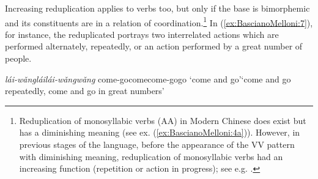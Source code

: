\documentclass[output=paper]{langsci/langscibook}
\begin{document}
Increasing reduplication applies to verbs too, but only if the base is
bimorphemic and its constituents are in a relation of
coordination.\footnote{Reduplication of monosyllabic verbs (AA) in Modern
  Chinese  does exist but has a diminishing meaning (see ex. (\ref{ex:BascianoMelloni:4a})).
  However, in previous stages of the language, before the appearance of
  the VV pattern with diminishing meaning, reduplication of monosyllabic
  verbs had an increasing function (repetition or action in progress);
  see e.g. \citet[7]{Xu2012a}.} 
  In (\ref{ex:BascianoMelloni:7}), for instance, the reduplicated 
portrays two interrelated actions which are performed alternately,
repeatedly, or an action performed by a great number of people.

\ea\label{ex:BascianoMelloni:7}%
        {\emph{lái-wǎng}}{\emph{lái\tld{}lái-wǎng\tld{}wǎng}}%
        {come-go}{come\tld{}come-go\tld{}go}%
        {`come and go'}{`come and go repeatedly, come and go in great numbers'}%
\z
\end{document}
